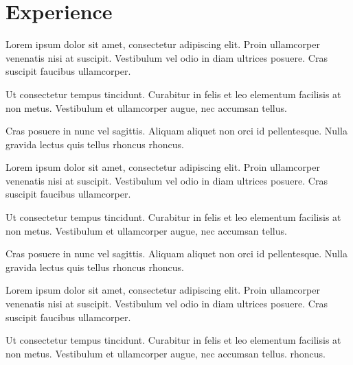 \documentclass[]{plushcv}
\begin{document}
\begin{minipage}[t]{0.70\textwidth}


  \section{Experience}
  \vspace{\topsep} %
  \begin{tightemize}
    \sectionsep
  \item Lorem ipsum dolor sit amet, consectetur adipiscing elit. Proin ullamcorper venenatis nisi at suscipit. Vestibulum vel odio in diam ultrices posuere. Cras suscipit faucibus ullamcorper.
  \item Ut consectetur tempus tincidunt. Curabitur in felis et leo elementum facilisis at non metus. Vestibulum et ullamcorper augue, nec accumsan tellus.
  \item Cras posuere in nunc vel sagittis. Aliquam aliquet non orci id pellentesque. Nulla gravida lectus quis tellus rhoncus rhoncus.
  \end{tightemize}
  \sectionsep

  \begin{tightemize}
    \sectionsep
  \item Lorem ipsum dolor sit amet, consectetur adipiscing elit. Proin ullamcorper venenatis nisi at suscipit. Vestibulum vel odio in diam ultrices posuere. Cras suscipit faucibus ullamcorper.
  \item Ut consectetur tempus tincidunt. Curabitur in felis et leo elementum facilisis at non metus. Vestibulum et ullamcorper augue, nec accumsan tellus.
  \item Cras posuere in nunc vel sagittis. Aliquam aliquet non orci id pellentesque. Nulla gravida lectus quis tellus rhoncus rhoncus.
  \end{tightemize}
  \sectionsep

  \begin{tightemize}
    \sectionsep
  \item Lorem ipsum dolor sit amet, consectetur adipiscing elit. Proin ullamcorper venenatis nisi at suscipit. Vestibulum vel odio in diam ultrices posuere. Cras suscipit faucibus ullamcorper.
  \item Ut consectetur tempus tincidunt. Curabitur in felis et leo elementum facilisis at non metus. Vestibulum et ullamcorper augue, nec accumsan tellus.
    rhoncus.
  \end{tightemize}
  \sectionsep


\end{minipage}
\end{document}
